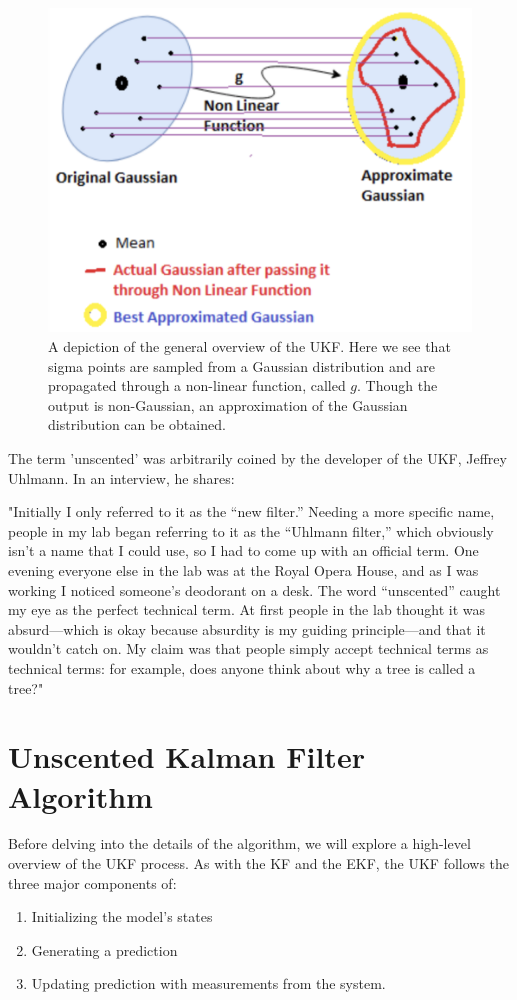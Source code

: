 \begin{figure}[h]
    \centering
    \includegraphics[scale = 0.7]{UKF.png}
    \caption{A depiction of the general overview of the UKF. Here we see that sigma points are sampled from a Gaussian distribution and are propagated through a non-linear function, called $g$. Though the output is non-Gaussian, an approximation of the Gaussian distribution can be obtained.}
\end{figure}

\newpage

\noindent The term 'unscented' was arbitrarily coined by the developer of the UKF, Jeffrey Uhlmann. In an interview, he shares:
\begin{displayquote}
"Initially I only referred to it as the “new filter.” Needing a more specific name, people in my lab began referring to it as the “Uhlmann filter,” which obviously isn’t a name that I could use, so I had to come up with an official term. One evening everyone else in the lab was at the Royal Opera House, and as I was working I noticed someone’s deodorant on a desk. The word “unscented” caught my eye as the perfect technical term. At first people in the lab thought it was absurd—which is okay because absurdity is my guiding principle—and that it wouldn’t catch on. My claim was that people simply accept technical terms as technical terms: for example, does anyone think about why a tree is called a tree?"
\end{displayquote}


\section{Unscented Kalman Filter Algorithm}
Before delving into the details of the algorithm, we will explore a high-level overview of the UKF process. As with the KF and the EKF, the UKF follows the three major components of:
\begin{enumerate}
  \item Initializing the model's states
  \item Generating a prediction
  \item Updating prediction with measurements from the system.
\end{enumerate}

